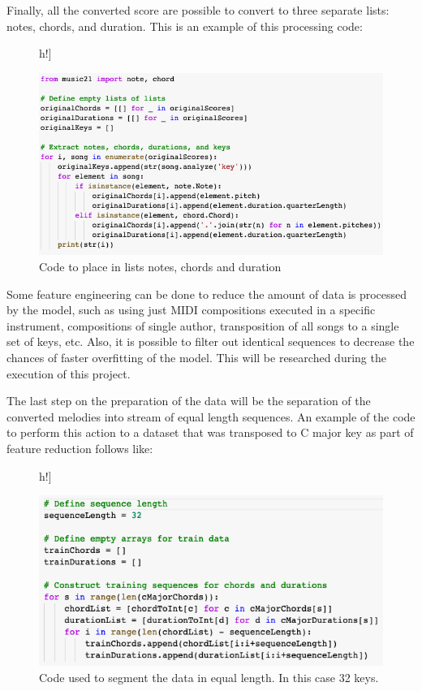 Finally, all the converted score are possible to convert to three separate lists: notes,
chords, and duration. This is an example of this processing code:

\begin{figure}[]h!]
  \caption{Code to place in lists notes, chords and duration }
  \includegraphics[width=\linewidth]{image/fig_JDF19.png}
\end{figure}


Some feature engineering can be done to reduce the amount of data is processed by the
model, such as using just MIDI compositions executed in a specific instrument,
compositions of single author, transposition of all songs to a single set of keys, etc.
Also, it is possible to filter out identical sequences to decrease the chances of faster
overfitting of the model. This will be researched during the execution of this project.

The last step on the preparation of the data will be the separation of the converted
melodies into stream of equal length sequences. An example of the code to perform this
action to a dataset that was transposed to C major key as part of feature reduction
follows like:

\begin{figure}[]h!]
  \caption{Code used to segment the data in equal length. In this case 32 keys.}
  \includegraphics[width=\linewidth]{image/fig_JDF20.png}
\end{figure}

